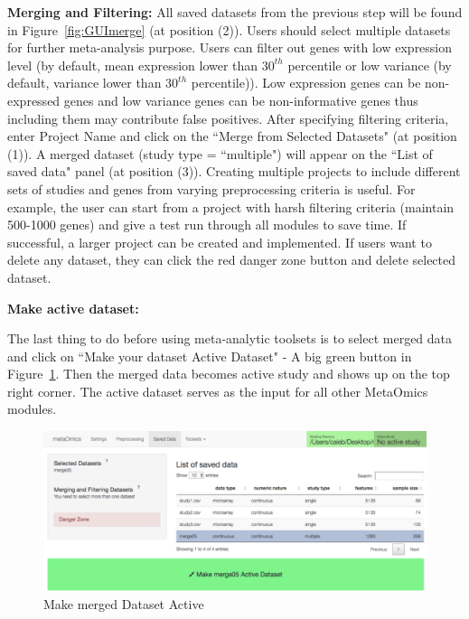 \begin{steps}
\item \textbf{Merging and Filtering:}
All saved datasets from the previous step will be found in  Figure~\ref{fig:GUImerge} (at position {\color{red} (2)}).
Users should select multiple datasets for further meta-analysis purpose.
Users can filter out genes with low expression level (by default, mean expression lower than $30^{th}$ percentile 
or low variance (by default, variance lower than $30^{th}$ percentile)).
Low expression genes can be non-expressed genes and low variance genes can be non-informative genes thus including them may contribute false positives.
After specifying filtering criteria, enter Project Name and click on the ``Merge from Selected Datasets" (at position {\color{red} (1)}).
A merged dataset (study type = ``multiple") will appear on the  ``List of saved data" panel (at position {\color{red} (3)}).
Creating multiple projects to include different sets of studies and genes from varying preprocessing criteria is useful.
For example, the user can start from a project with harsh filtering criteria (maintain 500-1000 genes) and give a test run through all modules to save time.
If successful, a larger project can be created and implemented.
If users want to delete any dataset, they can click the red danger zone button and delete selected dataset.

\item \textbf{Make active dataset:}

The last thing to do before using meta-analytic toolsets is to select merged data and click on 
``Make your dataset Active Dataset" - A big green button in Figure~\ref{fig:active}.
Then the merged data becomes active study and shows up on the top right corner.
The active dataset serves as the input for all other MetaOmics modules.


\end{steps}







\begin{figure}[H]
\begin{center}
\includegraphics[scale=0.4]{./figure/preprocessing/GUImarkActive}
\caption{Make merged Dataset Active}
\label{fig:active}
\end{center}
\end{figure}




